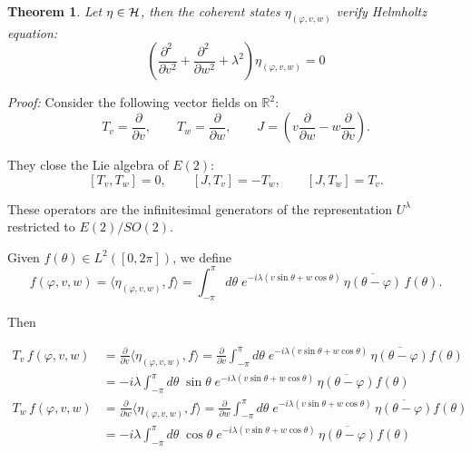 \documentclass[11pt]{article}
\newtheorem{theorem}[definition]{Theorem}
\newcommand{\R}{\mathbb{R}}
\newcommand{\conj}[1]{\overline{#1}}
\begin{document}
 \begin{theorem}\label{Helmholtz}
 Let $\eta\in{\cal H}$, then the coherent states $\eta_{(\varphi,v,w)}$ verify Helmholtz equation:
 \begin{equation}
  \left(\frac{\partial^2\,}{\partial v^2}+\frac{\partial^2\,}{\partial w^2}+\lambda^2\right)\eta_{(\varphi,v,w)}=0 \label{EqHelmholtz}
 \end{equation}
 \end{theorem}
 
 \textit{Proof:}
Consider the following vector fields on $\R^2$:
\[
  T_v= \frac{\partial}{\partial v},\qquad
  T_w= \frac{\partial}{\partial w},\qquad
  J=\left(v\frac{\partial}{\partial w}-w\frac{\partial}{\partial v}\right).
\]

They close the Lie algebra of $E(2)$:
\[
  [T_v,T_w]=0,\qquad
  [J,T_v]=-T_w,\qquad
  [J,T_w]=T_v.
\]

These operators are the infinitesimal generators of the representation $U^\lambda$ restricted to $E(2)/SO(2)$.


Given $f(\theta)\in L^2([0,2\pi])$, we define
\[
  f(\varphi,v,w)=\langle\eta_{(\varphi,v,w)},f\rangle
  =\int_{-\pi}^{\pi}d\theta\;e^{-i\lambda(v\sin\theta+w\cos\theta)}\,
   \conj{\eta(\theta-\varphi)}\,f(\theta).
\]

Then

\begin{eqnarray}
  T_v\,f(\varphi,v,w)
  &=\frac{\partial}{\partial v}\langle\eta_{(\varphi,v,w)},f\rangle
   =\frac{\partial}{\partial v}\int_{-\pi}^{\pi}d\theta\;
    e^{-i\lambda(v\sin\theta+w\cos\theta)}\,\conj{\eta(\theta-\varphi)}f(\theta)\nonumber\\
  &=-i\lambda\int_{-\pi}^{\pi}d\theta\;\sin\theta\;
    e^{-i\lambda(v\sin\theta+w\cos\theta)}\,\conj{\eta(\theta-\varphi)}f(\theta)\\[4pt]
  T_w\,f(\varphi,v,w)
  &=\frac{\partial}{\partial w}\langle\eta_{(\varphi,v,w)},f\rangle
   =\frac{\partial}{\partial w}\int_{-\pi}^{\pi}d\theta\;
    e^{-i\lambda(v\sin\theta+w\cos\theta)}\,\conj{\eta(\theta-\varphi)}f(\theta)\nonumber\\
  &=-i\lambda\int_{-\pi}^{\pi}d\theta\;\cos\theta\;
    e^{-i\lambda(v\sin\theta+w\cos\theta)}\,\conj{\eta(\theta-\varphi)}f(\theta)
\end{eqnarray}
\end{document}
